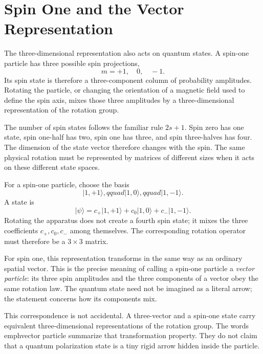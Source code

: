 \section{Spin One and the Vector Representation}

The three-dimensional representation also acts on quantum states. A spin-one
particle has three possible spin projections,
\begin{equation}
m=+1,\quad 0,\quad -1.
\end{equation}
Its spin state is therefore a three-component column of probability
amplitudes. Rotating the particle, or changing the orientation of a magnetic
field used to define the spin axis, mixes those three amplitudes by a
three-dimensional representation of the rotation group.

The number of spin states follows the familiar rule \(2s+1\). Spin zero has
one state, spin one-half has two, spin one has three, and spin three-halves has
four. The dimension of the state vector therefore changes with the spin. The
same physical rotation must be represented by matrices of different sizes
when it acts on these different state spaces.

For a spin-one particle, choose the basis
\begin{equation}
\lvert 1,+1\rangle,qquad
\lvert 1,0\rangle,qquad
\lvert 1,-1\rangle.
\end{equation}
A state is
\begin{equation}
\lvert\psi\rangle
=c_{+}\lvert1,+1\rangle+c_0\lvert1,0\rangle+c_{-}\lvert1,-1\rangle.
\end{equation}
Rotating the apparatus does not create a fourth spin state; it mixes the three
coefficients \(c_+,c_0,c_-\) among themselves. The corresponding rotation
operator must therefore be a \(3\times3\) matrix.

For spin one, this representation transforms in the same way as an ordinary
spatial vector. This is the precise meaning of calling a spin-one particle a
\emph{vector particle}: its three spin amplitudes and the three components of
a vector obey the same rotation law. The quantum state need not be imagined
as a literal arrow; the statement concerns how its components mix.

This correspondence is not accidental. A three-vector and a spin-one state
carry equivalent three-dimensional representations of the rotation group.
The words emph{vector particle} summarize that transformation property. They
do not claim that a quantum polarization state is a tiny rigid arrow hidden
inside the particle.

